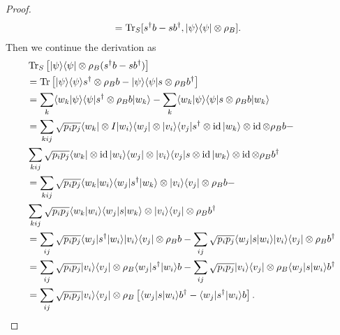 \documentclass[../../note.tex]{subfiles}
\begin{document}
\begin{proof}
\begin{align}
        &= \operatorname{Tr}_S[s^\dagger b -s b^\dagger, \vert \psi \rangle \langle \psi \vert \otimes \rho_B].
    \end{align}
    Then we continue the derivation as
    \begin{align}
        &\tr_S\left[\vert \psi \rangle \langle \psi \vert \otimes \rho_B (s^\dagger b - s b^\dagger)\right]\\
        &= \tr\left[\vert \psi \rangle \langle \psi \rangle s^\dagger \otimes \rho_B b - \vert \psi \rangle \langle \psi \vert s \otimes \rho_B b^\dagger \right] \\
        &= \sum_k \langle w_k \vert \psi \rangle \langle \psi \vert s^\dagger \otimes \rho_B b \vert w_k \rangle - \sum_k \langle w_k \vert \psi \rangle \langle \psi \vert s \otimes \rho_B b \vert w_k \rangle \\
        &= \sum_{kij} \sqrt{p_i p_j} \langle w_k \vert \otimes I \vert w_i \rangle \langle w_j \vert \otimes \vert v_i \rangle \langle v_j \vert s^\dagger \otimes \id \vert w_k \rangle \otimes \id \otimes \rho_B b - \\
        &\sum_{kij} \sqrt{p_i p_j} \langle w_k \vert \otimes \id \vert w_i \rangle \langle w_j \vert \otimes \vert v_i \rangle \langle v_j \vert s \otimes \id \vert w_k \rangle \otimes \id \otimes \rho_B b^\dagger \\
        &= \sum_{kij} \sqrt{p_i p_j} \langle w_k \vert w_i \rangle \langle w_j \vert s^\dagger \vert w_k \rangle \otimes \vert v_i \rangle \langle v_j \vert \otimes \rho_B b - \\
        &\sum_{kij} \sqrt{p_i p_j} \langle w_k \vert w_i \rangle \langle w_j \vert s \vert w_k \rangle \otimes \vert v_i \rangle \langle v_j \vert \otimes  \rho_B b^\dagger \\
        &= \sum_{ij} \sqrt{p_i p_j} \langle w_j \vert s^\dagger \vert w_i \rangle \vert v_i \rangle \langle v_j \vert \otimes \rho_B b -
        \sum_{ij} \sqrt{p_i p_j} \langle w_j \vert s \vert w_i \rangle \vert v_i \rangle \langle v_j \vert \otimes  \rho_B b^\dagger \\
        &= \sum_{ij} \sqrt{p_i p_j} \vert v_i \rangle \langle v_j \vert \otimes \rho_B \langle w_j \vert s^\dagger \vert w_i \rangle b -
        \sum_{ij} \sqrt{p_i p_j}  \vert v_i \rangle \langle v_j \vert \otimes  \rho_B \langle w_j \vert s \vert w_i \rangle b^\dagger \\
        &= \sum_{ij} \sqrt{p_i p_j} \vert v_i \rangle \langle v_j \vert \otimes \rho_B \left[\langle w_j \vert s \vert w_i \rangle b^\dagger - \langle w_j \vert s^\dagger \vert w_i \rangle b \right].

\end{align}
\end{proof}
\end{document}
